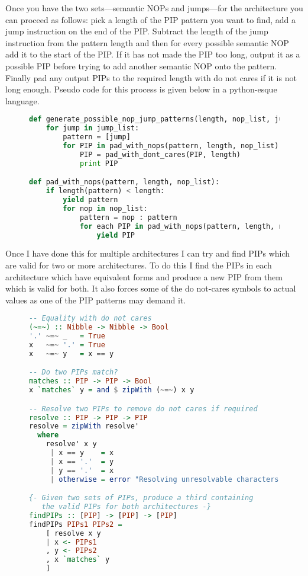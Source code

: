 \documentclass[10pt]{book}
\begin{document}
Once you have the two sets---semantic NOPs and jumps---for the
architecture you can proceed as follows: pick a length of the PIP
pattern you want to find, add a jump instruction on the end of the PIP.
Subtract the length of the jump instruction from the pattern length and
then for every possible semantic NOP add it to the start of the PIP. If
it has not made the PIP too long, output it as a possible PIP before
trying to add another semantic NOP onto the pattern. Finally pad any
output PIPs to the required length with do not cares if it is not long
enough. Pseudo code for this process is given below in a python-esque
language.

\begin{figure}
\begin{lstlisting}[language=python ,
caption=Algorithm used to generate PIPs]
def generate_possible_nop_jump_patterns(length, nop_list, jump_list):
    for jump in jump_list:
        pattern = [jump]
        for PIP in pad_with_nops(pattern, length, nop_list):
            PIP = pad_with_dont_cares(PIP, length)
            print PIP

def pad_with_nops(pattern, length, nop_list):
    if length(pattern) < length:
        yield pattern
        for nop in nop_list:
            pattern = nop : pattern
            for each PIP in pad_with_nops(pattern, length, nop_list):
                yield PIP           
\end{lstlisting}
\end{figure}

Once I have done this for multiple architectures I can try and find PIPs
which are valid for two or more architectures. To do this I find the
PIPs in each architecture which have equivalent forms and produce a new
PIP from them which is valid for both. It also forces some of the do
not-cares symbols to actual values as one of the PIP patterns may demand
it.

\begin{figure}
\begin{lstlisting}[language=haskell ,
caption=Method used for removing \emph{do not-cares} from potential PIP headers]
-- Equality with do not cares
(~=~) :: Nibble -> Nibble -> Bool
'.' ~=~ _   = True
x   ~=~ '.' = True
x   ~=~ y   = x == y

-- Do two PIPs match?
matches :: PIP -> PIP -> Bool
x `matches` y = and $ zipWith (~=~) x y

-- Resolve two PIPs to remove do not cares if required
resolve :: PIP -> PIP -> PIP
resolve = zipWith resolve'
  where
    resolve' x y
     | x == y    = x
     | x == '.'  = y
     | y == '.'  = x
     | otherwise = error "Resolving unresolvable characters"

{- Given two sets of PIPs, produce a third containing 
   the valid PIPs for both architectures -}
findPIPs :: [PIP] -> [PIP] -> [PIP]
findPIPs PIPs1 PIPs2 = 
    [ resolve x y
    | x <- PIPs1                            
    , y <- PIPs2                                      
    , x `matches` y
    ]
\end{lstlisting}
\end{figure}
\end{document}
